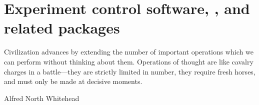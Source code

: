 \chapter{Experiment control software, \pyafm, and related packages}
\label{sec:pyafm}

\epigraph{Civilization advances by extending the number of important
  operations which we can perform without thinking about
  them. Operations of thought are like cavalry charges in a
  battle---they are strictly limited in number, they require fresh
  horses, and must only be made at decisive moments.}{Alfred North
  Whitehead\citep{whitehead11}}







